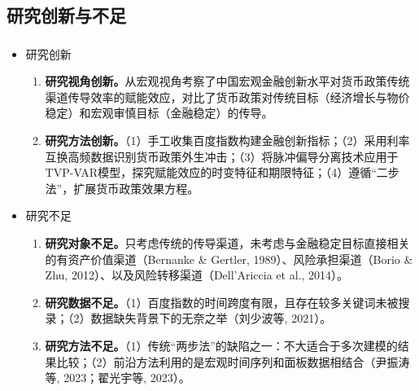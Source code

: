 \documentclass[12pt,aspectratio=169]{ctexbeamer}
\begin{document}
			\subsection{研究创新与不足}
			\begin{frame}[label=novelty]
				\frametitle{}
				\vspace{4mm}
				\begin{itemize}
					\item 研究创新
					\hyperlink{pr}{\beamergotobutton{}}
					\begin{enumerate}
						\justifying
						\footnotesize
						\item \textbf{研究视角创新。}从宏观视角考察了中国宏观金融创新水平对货币政策传统渠道传导效率的赋能效应，对比了货币政策对传统目标（经济增长与物价稳定）和宏观审慎目标（金融稳定）的传导。
						\item \textbf{研究方法创新。}（1）手工收集百度指数构建金融创新指标；（2）采用利率互换高频数据识别货币政策外生冲击；（3）将脉冲偏导分离技术应用于TVP-VAR模型，探究赋能效应的时变特征和期限特征；（4）遵循“二步法”，扩展货币政策效果方程。
					\end{enumerate}
				\vspace{0mm}
				\item 研究不足
					\begin{enumerate}
						\justifying
						\footnotesize
						\item \textbf{研究对象不足。}只考虑传统的传导渠道，未考虑与金融稳定目标直接相关的有资产价值渠道（Bernanke \& Gertler, 1989）、风险承担渠道（Borio \& Zhu, 2012）、以及风险转移渠道（Dell'Ariccia et al., 2014）。
						\item \textbf{研究数据不足。}（1）百度指数的时间跨度有限，且存在较多关键词未被搜录；（2）数据缺失背景下的无奈之举（刘少波等, 2021）。
						\item \textbf{研究方法不足。}（1）传统“两步法”的缺陷之一：不大适合于多次建模的结果比较；（2）前沿方法利用的是宏观时间序列和面板数据相结合（尹振涛等, 2023；翟光宇等, 2023）。
					\end{enumerate}
				\end{itemize}
			\end{frame}
\end{document}
